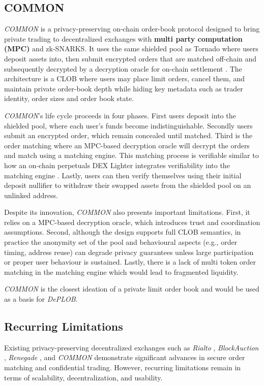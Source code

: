 \documentclass[12pt,a4paper]{article}
\begin{document}
\subsection{COMMON}
\textit{COMMON} is a privacy-preserving on-chain order-book protocol designed to bring private trading to decentralized exchanges with \textbf{multi party computation (MPC)} and zk-SNARKS. It uses the same shielded pool as Tornado where users deposit assets into, then submit encrypted orders that are matched off-chain and subsequently decrypted by a decryption oracle for on-chain settlement \parencite{cryptoeprint:2023/1868}. The architecture is a CLOB where users may place limit orders, cancel them, and maintain private order-book depth while hiding key metadata such as trader identity, order sizes and order book state. 

\textit{COMMON}’s life cycle proceeds in four phases. First users deposit into the shielded pool, where each user’s funds become indistinguishable. Secondly users submit an encrypted order, which remain concealed until matched. Third is the order matching where an MPC-based decryption oracle will decrypt the orders and match using a matching engine. This matching process is verifiable similar to how an on-chain perpetuals DEX Lighter integrates verifiability into the matching engine \parencite{lighter2025protocol}. Lastly, users can then verify themselves using their initial deposit nullifier to withdraw their swapped assets from the shielded pool on an unlinked address. 

Despite its innovation, \textit{COMMON} also presents important limitations. First, it relies on a MPC-based decryption oracle, which introduces trust and coordination assumptions. Second, although the design supports full CLOB semantics, in practice the anonymity set of the pool and behavioural aspects (e.g., order timing, address reuse) can degrade privacy guarantees unless large participation or proper user behaviour is sustained. Lastly, there is a lack of multi token order matching in the matching engine which would lead to fragmented liquidity. 

\textit{COMMON} is the closest ideation of a private limit order book and would be used as a basis for \textit{DePLOB}.

\subsection{Recurring Limitations}
Existing privacy-preserving decentralized exchanges such as \textit{Rialto} \parencite{govindarajan2022rialto}, \textit{BlockAuction} \cite{constantinides2021blockauction}, \textit{Renegade} \parencite{bender2024renegade}, and \textit{COMMON} \parencite{cryptoeprint:2023/1868} demonstrate significant advances in secure order matching and confidential trading. However, recurring limitations remain in terms of scalability, decentralization, and usability. 
\end{document}
